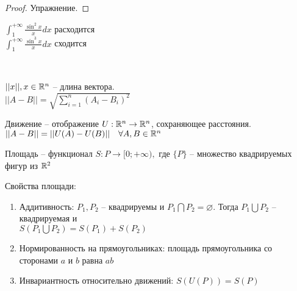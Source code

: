 \begin{proof}
	Упражнение.
\end{proof}

\begin{Cons}
	$\displaystyle \int_{1}^{+\infty} \frac{\sin^2 x}{x} dx$ расходится\\
	$\displaystyle \int_{1}^{+\infty} \frac{\sin^3 x}{x} dx$ сходится
\end{Cons}

\\
\begin{Def} 
	$||x||, x \in \mathbb{R}^n$ -- длина вектора. \\
	$\displaystyle ||A-B|| = \sqrt{\sum_{i=1}^{n} (A_i - B_i)^2}$
\end{Def} 

\begin{Def} 
	Движение -- отображение $U: \mathbb{R}^n \to \mathbb{R}^n$, сохраняющее расстояния.\\
	$||A-B|| = ||U(A) - U(B)|| \ \ \ \forall A, B \in \mathbb{R}^n$ 
\end{Def} 

\begin{Def} 
	Площадь -- функционал $S: {P} \to [0; +\infty),$ где $\{P\}$ -- множество квадрируемых фигур из $\mathbb{R}^2$
\end{Def} 

Свойства площади: 
\begin{enumerate}
	\item Аддитивность: $P_1, P_2$ -- квадрируемы и $P_1 \bigcap P_2 = \varnothing$. Тогда
	$P_1 \bigcup P_2$ -- квадрируемая и \\$S(P_1 \bigcup P_2) = S(P_1) + S(P_2)$
	\item Нормированность на прямоугольниках: площадь прямоугольника со сторонами $a$ и $b$ равна $ab$
	\item Инвариантность относительно движений: $S(U(P)) = S(P)$
\end{enumerate}

